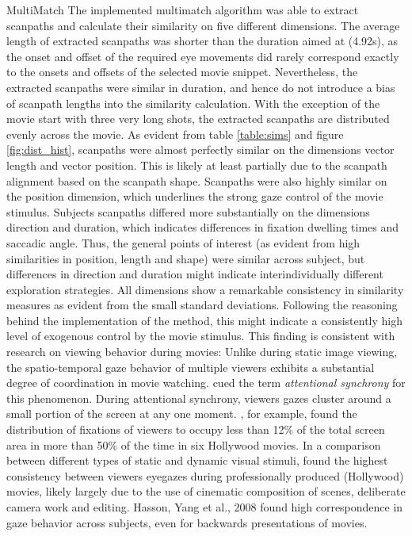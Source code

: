 \documentclass[a4paper, 12pt]{scrreprt}
\begin{document}
MultiMatch\newline
The implemented multimatch algorithm was able to extract scanpaths and calculate their similarity on five different dimensions. The average length of extracted scanpaths was shorter than the duration aimed at (4.92s), as the onset and offset of the required eye movements did rarely correspond exactly to the onsets and offsets of the selected movie snippet. Nevertheless, the extracted scanpaths were similar in duration, and hence do not introduce a bias of scanpath lengths into the similarity calculation. With the exception of the movie start with three very long shots, the extracted scanpaths are distributed evenly across the movie. As evident from table \ref{table:sims} and figure \ref{fig:dist_hist}, scanpaths were almost perfectly similar on the dimensions vector length and vector position. This is likely at least partially due to the scanpath alignment based on the scanpath shape. Scanpaths were also highly similar on the position dimension, which underlines the strong gaze control of the movie stimulus. Subjects scanpaths differed more substantially on the dimensions direction and duration, which indicates differences in fixation dwelling times and saccadic angle. Thus, the general points of interest (as evident from high similarities in position, length and shape) were similar across subject, but differences in direction and duration might indicate interindividually different exploration strategies. All dimensions show a remarkable consistency in similarity measures as evident from the small standard deviations. Following the reasoning behind the implementation of the method, this might indicate a consistently high level of exogenous control by the movie stimulus. This finding is consistent with research on viewing behavior during movies: Unlike during static image viewing, the spatio-temporal gaze behavior of multiple viewers exhibits a substantial degree of coordination in movie watching. \textcite{smith2008attentional} cued the term \textit{attentional synchrony} for this phenomenon. During attentional synchrony, viewers gazes cluster around a small portion of the screen at any one moment. \textcite{goldstein2007people}, for example, found the distribution of fixations of viewers to occupy less than 12\% of the total screen area in more than 50\% of the time in six Hollywood movies. In a comparison between different types of static and dynamic visual stimuli, \textcite{dorr2010variability} found the highest consistency between viewers eyegazes during professionally produced (Hollywood) movies, likely largely due to the use of cinematic composition of scenes, deliberate camera work and editing. Hasson, Yang et al., 2008 found high correspondence in gaze behavior across subjects, even for backwards presentations of movies.
\end{document}

